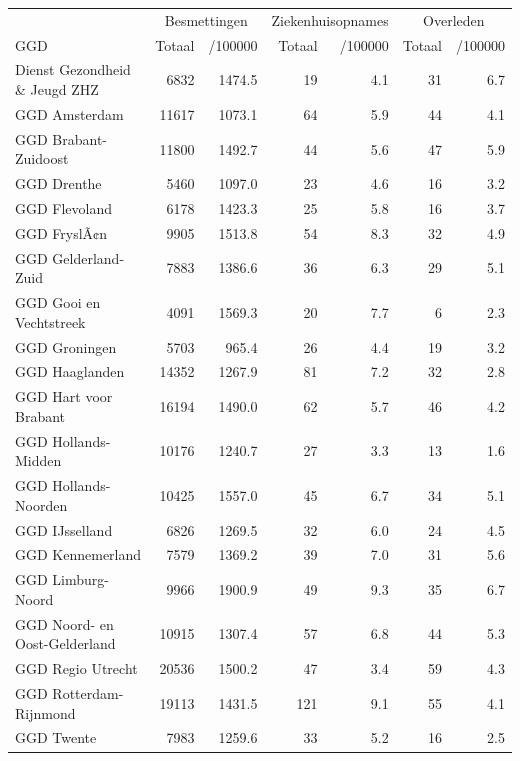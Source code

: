 \documentclass[
  english,
  man,floatsintext]{apa6}
\begin{document}
\begin{table}
\centering\begingroup\fontsize{10}{12}\selectfont

\begin{threeparttable}
\begin{tabular}{lrrrrrr}
\toprule
\multicolumn{1}{c}{ } & \multicolumn{2}{c}{Besmettingen} & \multicolumn{2}{c}{Ziekenhuisopnames} & \multicolumn{2}{c}{Overleden} \\
\cmidrule(l{3pt}r{3pt}){2-3} \cmidrule(l{3pt}r{3pt}){4-5} \cmidrule(l{3pt}r{3pt}){6-7}
GGD & Totaal & /100000 & Totaal & /100000 & Totaal & /100000\\
\midrule
Dienst Gezondheid \& Jeugd ZHZ & 6832 & 1474.5 & 19 & 4.1 & 31 & 6.7\\
GGD Amsterdam & 11617 & 1073.1 & 64 & 5.9 & 44 & 4.1\\
GGD Brabant-Zuidoost & 11800 & 1492.7 & 44 & 5.6 & 47 & 5.9\\
GGD Drenthe & 5460 & 1097.0 & 23 & 4.6 & 16 & 3.2\\
GGD Flevoland & 6178 & 1423.3 & 25 & 5.8 & 16 & 3.7\\
GGD FryslÃ¢n & 9905 & 1513.8 & 54 & 8.3 & 32 & 4.9\\
GGD Gelderland-Zuid & 7883 & 1386.6 & 36 & 6.3 & 29 & 5.1\\
GGD Gooi en Vechtstreek & 4091 & 1569.3 & 20 & 7.7 & 6 & 2.3\\
GGD Groningen & 5703 & 965.4 & 26 & 4.4 & 19 & 3.2\\
GGD Haaglanden & 14352 & 1267.9 & 81 & 7.2 & 32 & 2.8\\
GGD Hart voor Brabant & 16194 & 1490.0 & 62 & 5.7 & 46 & 4.2\\
GGD Hollands-Midden & 10176 & 1240.7 & 27 & 3.3 & 13 & 1.6\\
GGD Hollands-Noorden & 10425 & 1557.0 & 45 & 6.7 & 34 & 5.1\\
GGD IJsselland & 6826 & 1269.5 & 32 & 6.0 & 24 & 4.5\\
GGD Kennemerland & 7579 & 1369.2 & 39 & 7.0 & 31 & 5.6\\
GGD Limburg-Noord & 9966 & 1900.9 & 49 & 9.3 & 35 & 6.7\\
GGD Noord- en Oost-Gelderland & 10915 & 1307.4 & 57 & 6.8 & 44 & 5.3\\
GGD Regio Utrecht & 20536 & 1500.2 & 47 & 3.4 & 59 & 4.3\\
GGD Rotterdam-Rijnmond & 19113 & 1431.5 & 121 & 9.1 & 55 & 4.1\\
GGD Twente & 7983 & 1259.6 & 33 & 5.2 & 16 & 2.5\\

\end{tabular}
\end{threeparttable}
\end{table}
\end{document}

